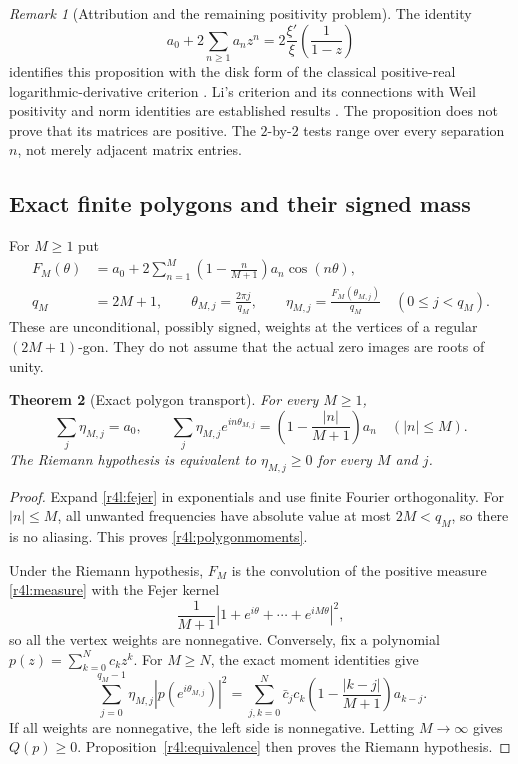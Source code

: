 \documentclass[11pt,a4paper]{article}
\newtheorem{theorem}{Theorem}[section]
\theoremstyle{definition}\newtheorem{definition}[theorem]{Definition}
\theoremstyle{remark}\newtheorem{remark}[theorem]{Remark}
\numberwithin{equation}{section}
\begin{document}
\begin{remark}[Attribution and the remaining positivity problem]
\label{r4l:classicalscope}
The identity
\[
 a_0+2\sum_{n\ge1}a_nz^n
 =2\frac{\xi'}{\xi}\!\left(\frac1{1-z}\right)
\]
identifies this proposition with the disk form of the classical
positive-real logarithmic-derivative criterion \cite{Lagarias}.
Li's criterion and its connections with Weil positivity and norm
identities are established results \cite{Li,Suzuki}.  The proposition
does not prove that its matrices are positive.  The $2$-by-$2$ tests
range over every separation $n$, not merely adjacent matrix entries.
\end{remark}

\subsection{Exact finite polygons and their signed mass}

For $M\ge1$ put
\begin{align}
 F_M(\theta)&=a_0+2\sum_{n=1}^M
      \left(1-\frac n{M+1}\right)a_n\cos(n\theta),
       \label{r4l:fejer}\\
 q_M&=2M+1,\qquad \theta_{M,j}=\frac{2\pi j}{q_M},
 \qquad
 \eta_{M,j}=\frac{F_M(\theta_{M,j})}{q_M}
 \quad(0\le j<q_M).\label{r4l:polygonweights}
\end{align}
These are unconditional, possibly signed, weights at the vertices of
a regular $(2M+1)$-gon.  They do not assume that the actual zero images
are roots of unity.

\begin{theorem}[Exact polygon transport]\label{r4l:polygon}
For every $M\ge1$,
\begin{equation}\label{r4l:polygonmoments}
 \sum_j\eta_{M,j}=a_0,
 \qquad
 \sum_j\eta_{M,j}e^{in\theta_{M,j}}
 =\left(1-\frac{|n|}{M+1}\right)a_n
 \quad(|n|\le M).
\end{equation}
The Riemann hypothesis is equivalent to
$\eta_{M,j}\ge0$ for every $M$ and $j$.
\end{theorem}
\begin{proof}
Expand \eqref{r4l:fejer} in exponentials and use finite Fourier
orthogonality.  For $|n|\le M$, all unwanted frequencies have absolute
value at most $2M<q_M$, so there is no aliasing.  This proves
\eqref{r4l:polygonmoments}.

Under the Riemann hypothesis, $F_M$ is the convolution of the positive
measure \eqref{r4l:measure} with the Fejer kernel
\[
 \frac1{M+1}|1+e^{i\theta}+\cdots+e^{iM\theta}|^2,
\]
so all the vertex weights are nonnegative.  Conversely, fix a
polynomial $p(z)=\sum_{k=0}^Nc_kz^k$.  For $M\ge N$, the exact
moment identities give
\begin{equation}\label{r4l:polygonquadratic}
 \sum_{j=0}^{q_M-1}\eta_{M,j}|p(e^{i\theta_{M,j}})|^2
 =\sum_{j,k=0}^N\bar c_jc_k
       \left(1-\frac{|k-j|}{M+1}\right)a_{k-j}.
\end{equation}
If all weights are nonnegative, the left side is nonnegative.  Letting
$M\to\infty$ gives $Q(p)\ge0$.  Proposition~\ref{r4l:equivalence}
then proves the Riemann hypothesis.
\end{proof}
\end{document}

